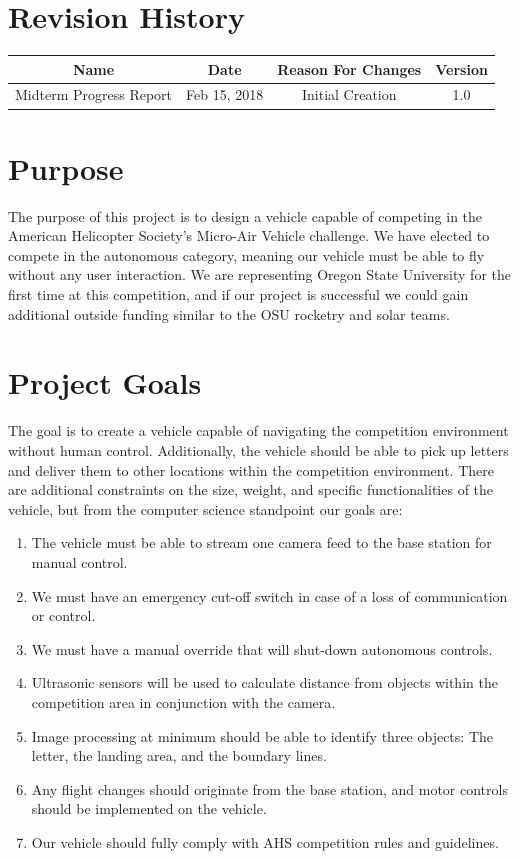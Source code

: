 \documentclass[onecolumn, draftclsnofoot,10pt, compsoc]{IEEEtran}
\begin{document}
\section*{Revision History}

\begin{center}
    \begin{tabular}{|c|c|c|c|}
        \hline
		Name & Date & Reason For Changes & Version\\
        \hline
		Midterm Progress Report & Feb 15, 2018 & Initial Creation & 1.0\\
		\hline 
    \end{tabular}
\end{center}




\section{Purpose}

The purpose of this project is to design a vehicle capable of competing in the American Helicopter Society’s Micro-Air Vehicle challenge. We have elected to compete in the autonomous category, meaning our vehicle must be able to fly without any user interaction. We are representing Oregon State University for the first time at this competition, and if our project is successful we could gain additional outside funding similar to the OSU rocketry and solar teams.

\section{Project Goals}
The goal is to create a vehicle capable of navigating the competition environment without human control. Additionally, the vehicle should be able to pick up letters and deliver them to other locations within the competition environment. There are additional constraints on the size, weight, and specific functionalities of the vehicle, but from the computer science standpoint our goals are:

\begin{enumerate}
\item{The vehicle must be able to stream one camera feed to the base station for manual control. }
\item{We must have an emergency cut-off switch in case of a loss of communication or control. }
\item{We must have a manual override that will shut-down autonomous controls.}
\item{Ultrasonic sensors will be used to calculate distance from objects within the competition area in conjunction with the camera.}
\item{Image processing at minimum should be able to identify three objects: The letter, the landing area, and the boundary lines.}
\item{Any flight changes should originate from the base station, and motor controls should be implemented on the vehicle.}
\item{Our vehicle should fully comply with AHS competition rules and guidelines. }
\end{enumerate}
\end{document}
